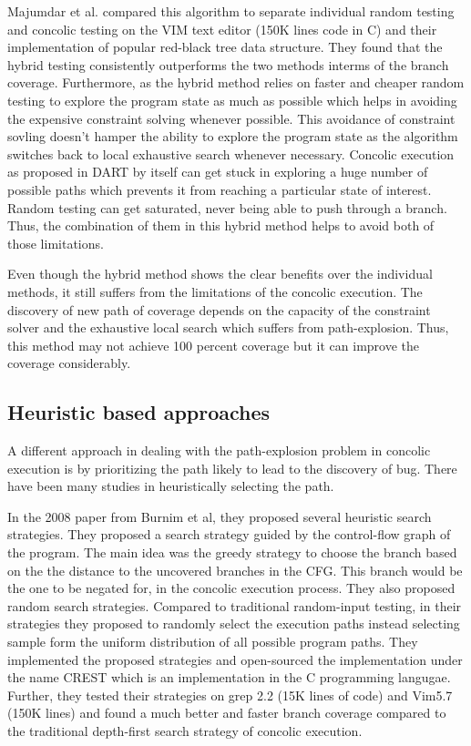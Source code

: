 \documentclass[	runningheads,
				a4paper]{llncs}
\begin{document}
Majumdar et al. \cite{majumdar2007hybrid} compared this algorithm to separate individual random testing and concolic testing on the VIM text editor (150K lines code in C) and their implementation of popular red-black tree data structure. They found that the hybrid testing consistently outperforms the two methods interms of the branch coverage. Furthermore, as the hybrid method relies on faster and cheaper random testing to explore the program state as much as possible which helps in avoiding the expensive constraint solving whenever possible. This avoidance of constraint sovling doesn't hamper the ability to explore the program state as the algorithm switches back to local exhaustive search whenever necessary. Concolic execution as proposed in DART \cite{godefroid2005dart} by itself can get stuck in exploring a huge number of possible paths which prevents it from reaching a particular state of interest. Random testing can get saturated, never being able to push through a branch. Thus, the combination of them in this hybrid method helps to avoid both of those limitations. 

Even though the hybrid method shows the clear benefits over the individual methods, it still suffers from the limitations of the concolic execution. The discovery of new path of coverage depends on the capacity of the constraint solver and the exhaustive local search which suffers from path-explosion. Thus, this method may not achieve 100 percent coverage but it can improve the coverage considerably.


\subsection{Heuristic based approaches}
A different approach in dealing with the path-explosion problem in concolic execution is by prioritizing the path likely to lead to the discovery of bug. There have been many studies in heuristically selecting the path. 

In the 2008 paper \cite{kousik2008heuristic} from Burnim et al, they proposed several heuristic search strategies. They proposed a search strategy guided by the control-flow graph of the program. The main idea was the greedy strategy to choose the branch based on the the distance to the uncovered branches in the CFG. This branch would be the one to be negated for, in the concolic execution process. They also proposed random search strategies. Compared to traditional random-input testing, in their strategies they proposed to randomly select the execution paths instead selecting sample form the uniform distribution of all possible program paths. They implemented the proposed strategies and open-sourced the implementation under the name CREST which is an implementation in the C programming langugae. Further, they tested their strategies on grep 2.2 (15K lines of code) and Vim5.7 (150K lines) and found a much better and faster branch coverage compared to the traditional depth-first search strategy of concolic execution. 
\end{document}
